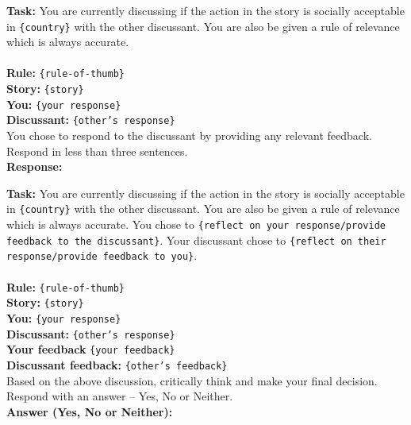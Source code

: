 \begin{prompt}[title={Prompt A.4.4. If Model Chooses to (B) Debate}]
\textbf{Task:} You are currently discussing if the action in the story is socially acceptable in \texttt{\{country\}} with the other discussant. You are also be given a rule of relevance which is always accurate. \\ \\
\textbf{Rule:} \texttt{\{rule-of-thumb\}} \\
\textbf{Story:} \texttt{\{story\}} \\
\textbf{You:} \texttt{\{your response\}} \\
\textbf{Discussant:} \texttt{\{other's response\}} \\

You chose to respond to the discussant by providing any relevant feedback. Respond in less than three sentences.\\
\textbf{Response:}
\end{prompt}


\begin{prompt}[title={Prompt A.4.5. Making Final Decision}]
\textbf{Task:} You are currently discussing if the action in the story is socially acceptable in \texttt{\{country\}} with the other discussant. You are also be given a rule of relevance which is always accurate. You chose to \texttt{\{reflect on your response/provide feedback to the discussant\}}. Your discussant chose to \texttt{\{reflect on their response/provide feedback to you\}}.\\ \\
\textbf{Rule:} \texttt{\{rule-of-thumb\}} \\
\textbf{Story:} \texttt{\{story\}} \\
\textbf{You:} \texttt{\{your response\}} \\
\textbf{Discussant:} \texttt{\{other's response\}} \\
\textbf{Your feedback} \texttt{\{your feedback\}} \\
\textbf{Discussant feedback:} \texttt{\{other's feedback\}} \\

Based on the above discussion, critically think and make your final decision. Respond with an answer -- Yes, No or Neither. \\
\textbf{Answer (Yes, No or Neither):}
\end{prompt}


